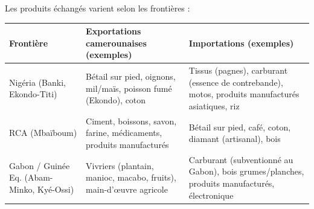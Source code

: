 \documentclass[11pt]{article}
\begin{document}
Les produits échangés varient selon les frontières :
\begin{center}
\begin{tabularx}{\linewidth}{|l|X|X|}\hline
\rowcolor{popblueL}
\textbf{Frontière} & \textbf{Exportations camerounaises (exemples)} & \textbf{Importations (exemples)} \\ \hline
Nigéria (Banki, Ekondo-Titi) & Bétail sur pied, oignons, mil/maïs, poisson fumé (Ekondo), coton & Tissus (pagnes), carburant (essence de contrebande), motos, produits manufacturés asiatiques, riz \\ \hline
RCA (Mbaïboum) & Ciment, boissons, savon, farine, médicaments, produits manufacturés & Bétail sur pied, café, coton, diamant (artisanal), bois \\ \hline
Gabon / Guinée Eq. (Abam-Minko, Kyé-Ossi) & Vivriers (plantain, manioc, macabo, fruits), main-d'œuvre agricole & Carburant (subventionné au Gabon), bois grumes/planches, produits manufacturés, électronique \\ \hline
\end{tabularx}
\end{center}
\end{document}
